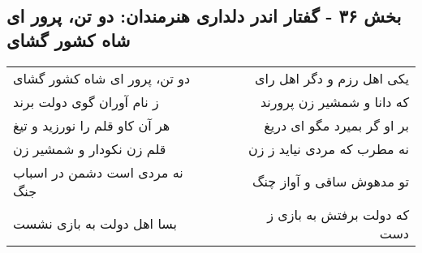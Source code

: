 \begin{center}
\section*{بخش ۳۶ - گفتار اندر دلداری هنرمندان: دو تن، پرور ای شاه کشور گشای}
\label{sec:036}
\begin{longtable}{l p{0.5cm} r}
دو تن، پرور ای شاه کشور گشای
&&
یکی اهل رزم و دگر اهل رای
\\
ز نام آوران گوی دولت برند
&&
که دانا و شمشیر زن پرورند
\\
هر آن کاو قلم را نورزید و تیغ
&&
بر او گر بمیرد مگو ای دریغ
\\
قلم زن نکودار و شمشیر زن
&&
نه مطرب که مردی نیاید ز زن
\\
نه مردی است دشمن در اسباب جنگ
&&
تو مدهوش ساقی و آواز چنگ
\\
بسا اهل دولت به بازی نشست
&&
که دولت برفتش به بازی ز دست
\\
\end{longtable}
\end{center}
